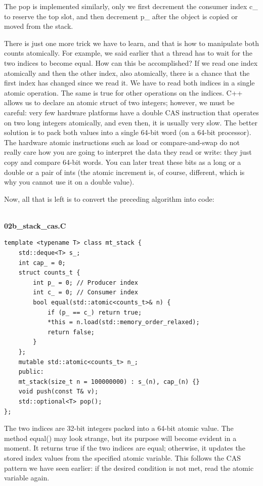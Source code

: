 The pop is implemented similarly, only we first decrement the consumer index c\_ to reserve the top slot, and then decrement p\_ after the object is copied or moved from the stack.

There is just one more trick we have to learn, and that is how to manipulate both counts atomically. For example, we said earlier that a thread has to wait for the two indices to become equal. How can this be accomplished? If we read one index atomically and then the other index, also atomically, there is a chance that the first index has changed since we read it. We have to read both indices in a single atomic operation. The same is true for other operations on the indices. C++ allows us to declare an atomic struct of two integers; however, we must be careful: very few hardware platforms have a double CAS instruction that operates on two long integers atomically, and even then, it is usually very slow. The better solution is to pack both values into a single 64-bit word (on a 64-bit processor). The hardware atomic instructions such as load or compare-and-swap do not really care how you are going to interpret the data they read or write: they just copy and compare 64-bit words. You can later treat these bits as a long or a double or a pair of ints (the atomic increment is, of course, different, which is why you cannot use it on a double value).

Now, all that is left is to convert the preceding algorithm into code:

\hspace*{\fill} \\ %
\noindent
\textbf{02b\_stack\_cas.C}
\begin{lstlisting}[style=styleCXX]
template <typename T> class mt_stack {
	std::deque<T> s_;
	int cap_ = 0;
	struct counts_t {
		int p_ = 0; // Producer index
		int c_ = 0; // Consumer index
		bool equal(std::atomic<counts_t>& n) {
			if (p_ == c_) return true;
			*this = n.load(std::memory_order_relaxed);
			return false;
		}
	};
	mutable std::atomic<counts_t> n_;
	public:
	mt_stack(size_t n = 100000000) : s_(n), cap_(n) {}
	void push(const T& v);
	std::optional<T> pop();
};
\end{lstlisting}

The two indices are 32-bit integers packed into a 64-bit atomic value. The method equal() may look strange, but its purpose will become evident in a moment. It returns true if the two indices are equal; otherwise, it updates the stored index values from the specified atomic variable. This follows the CAS pattern we have seen earlier: if the desired condition is not met, read the atomic variable again.

